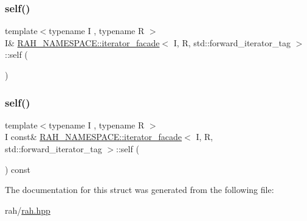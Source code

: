 \subsubsection{\texorpdfstring{self()}{self()}\hspace{0.1cm}{\footnotesize\ttfamily [1/2]}}
{\footnotesize\ttfamily template$<$typename I , typename R $>$ \\
I\& \mbox{\hyperlink{struct_r_a_h___n_a_m_e_s_p_a_c_e_1_1iterator__facade}{R\+A\+H\+\_\+\+N\+A\+M\+E\+S\+P\+A\+C\+E\+::iterator\+\_\+facade}}$<$ I, R, std\+::forward\+\_\+iterator\+\_\+tag $>$\+::self (\begin{DoxyParamCaption}{ }\end{DoxyParamCaption})\hspace{0.3cm}{\ttfamily [inline]}}

\mbox{\label{struct_r_a_h___n_a_m_e_s_p_a_c_e_1_1iterator__facade_3_01_i_00_01_r_00_01std_1_1forward__iterator__tag_01_4_a6853dfd7232e7cf3d5ae1de49bb635b6}} 
\subsubsection{\texorpdfstring{self()}{self()}\hspace{0.1cm}{\footnotesize\ttfamily [2/2]}}
{\footnotesize\ttfamily template$<$typename I , typename R $>$ \\
I const\& \mbox{\hyperlink{struct_r_a_h___n_a_m_e_s_p_a_c_e_1_1iterator__facade}{R\+A\+H\+\_\+\+N\+A\+M\+E\+S\+P\+A\+C\+E\+::iterator\+\_\+facade}}$<$ I, R, std\+::forward\+\_\+iterator\+\_\+tag $>$\+::self (\begin{DoxyParamCaption}{ }\end{DoxyParamCaption}) const\hspace{0.3cm}{\ttfamily [inline]}}



The documentation for this struct was generated from the following file\+:\begin{DoxyCompactItemize}
\item 
rah/\mbox{\hyperlink{rah_8hpp}{rah.\+hpp}}\end{DoxyCompactItemize}
